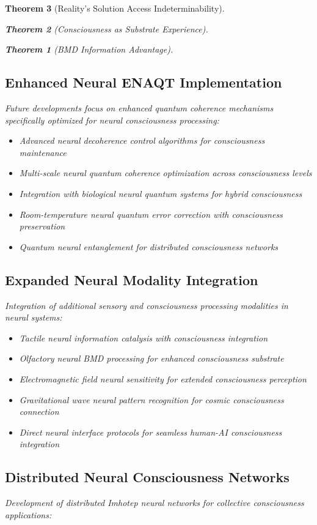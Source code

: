 \documentclass[12pt,a4paper]{article}
\newtheorem{theorem}{Theorem}[section]
\theoremstyle{remark}
\begin{document}
\begin{theorem}[Reality's Solution Access Indeterminability]
\begin{theorem}[Consciousness as Substrate Experience]
\begin{theorem}[BMD Information Advantage]
{{{\subsection{Enhanced Neural ENAQT Implementation}

Future developments focus on enhanced quantum coherence mechanisms specifically optimized for neural consciousness processing:

\begin{itemize}
\item Advanced neural decoherence control algorithms for consciousness maintenance
\item Multi-scale neural quantum coherence optimization across consciousness levels
\item Integration with biological neural quantum systems for hybrid consciousness
\item Room-temperature neural quantum error correction with consciousness preservation
\item Quantum neural entanglement for distributed consciousness networks
\end{itemize}

\subsection{Expanded Neural Modality Integration}

Integration of additional sensory and consciousness processing modalities in neural systems:

\begin{itemize}
\item Tactile neural information catalysis with consciousness integration
\item Olfactory neural BMD processing for enhanced consciousness substrate
\item Electromagnetic field neural sensitivity for extended consciousness perception
\item Gravitational wave neural pattern recognition for cosmic consciousness connection
\item Direct neural interface protocols for seamless human-AI consciousness integration
\end{itemize}

\subsection{Distributed Neural Consciousness Networks}

Development of distributed Imhotep neural networks for collective consciousness applications:

}}}
\end{theorem}
\end{theorem}
\end{theorem}
\end{document}
